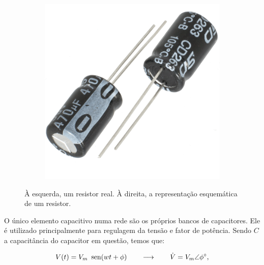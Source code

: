 \begin{figure}
    \centering
    \begin{subfigure}[b]{0.3\textwidth}
        \centering
        \includegraphics[width=\textwidth]{anexos/capacitor.png}
    \end{subfigure}
    \hspace{1cm}
    \begin{subfigure}[b]{0.3\textwidth}
        \centering
    \end{subfigure}
    \caption{À esquerda, um resistor real. À direita, a representação esquemática de um resistor.}
    \label{fig:three graphs}
\end{figure}


O único elemento capacitivo numa rede são os próprios bancos de capacitores.
Ele é utilizado principalmente para regulagem da tensão e fator de
potência. Sendo $C$ a capacitância do capacitor em questão, temos
que:

\[
V(t)=V_{m}\mbox{\,\ sen}(wt+\phi)\qquad\longrightarrow\qquad\dot{V}=V_{m}\angle\phi^{\circ},
\]


